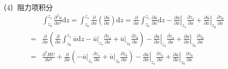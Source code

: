 （4）阻力项积分
\begin{equation}
  \begin{aligned}
    &\int_{z_{b}}^{ z_{s}}\!
    \frac{\partial^{2} \overline{u}}{\partial x^{2}}
    \mathrm{d}z
    =
    \int_{z_{b}}^{ z_{s}}\!
    \frac{\partial}{\partial x}
    \left(\frac{\partial \overline{u}}{\partial x}\right)
    \mathrm{d}z
    =
    \frac{\partial}{\partial x}
    \int_{z_{b}}^{ z_{s}}\!
    \frac{\partial \overline{u}}{\partial x}
    \mathrm{d}z
    -
    \left.\frac{\partial \overline{u}}{\partial x}\right|_{z_{s}}\frac{\partial  z_{s}}{\partial x}
    +
    \left.\frac{\partial \overline{u}}{\partial x}\right|_{z_{b}}\frac{\partial z_{b}}{\partial x}
    \\
    =&
    \frac{\partial}{\partial x}
    \left(
    \frac{\partial}{\partial x}
    \int_{z_{b}}^{ z_{s}}\!
    \overline{u}
    \mathrm{d}z
    -
    \left.\overline{u}\right|_{z_{s}}\frac{\partial  z_{s}}{\partial x}
    +
    \left.\overline{u}\right|_{z_{b}}\frac{\partial z_{b}}{\partial x}
    \right)
    -
    \left.\frac{\partial \overline{u}}{\partial x}\right|_{z_{s}}\frac{\partial  z_{s}}{\partial x}
    +
    \left.\frac{\partial \overline{u}}{\partial x}\right|_{z_{b}}\frac{\partial z_{b}}{\partial x}
    \\
    =&
    \frac{\partial^{2} HU}{\partial x^{2}} +
    \frac{\partial}{\partial x}
    \left(
    -
    \left.\overline{u}\right|_{z_{s}}\frac{\partial  z_{s}}{\partial x}
    +
    \left.\overline{u}\right|_{z_{b}}\frac{\partial z_{b}}{\partial x}
    \right)
    -
    \left.\frac{\partial \overline{u}}{\partial x}\right|_{z_{s}}\frac{\partial  z_{s}}{\partial x}
    +
    \left.\frac{\partial \overline{u}}{\partial x}\right|_{z_{b}}\frac{\partial z_{b}}{\partial x}
  \end{aligned}
  \label{EqCGe_Shear_1}
\end{equation}

